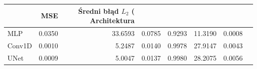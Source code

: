 \begin{tabular}{lrrrrrr}
\toprule
 & MSE & Średni błąd $L_2$ (%
Architektura &  &  &  &  &  &  \\
\midrule
MLP & 0.0350 & 33.6593 & 0.0785 & 0.9293 & 11.3190 & 0.0008 \\
Conv1D & 0.0010 & 5.2487 & 0.0140 & 0.9978 & 27.9147 & 0.0043 \\
UNet & 0.0009 & 5.0047 & 0.0137 & 0.9980 & 28.2075 & 0.0056 \\
\bottomrule
\end{tabular}
